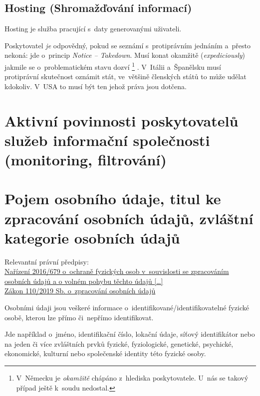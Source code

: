 \subsection{Hosting (Shromažďování informací)}

Hosting je služba pracující s~daty generovanými uživateli.

Poskytovatel \emph{je} odpovědný, pokud se seznámí s~protiprávním jednáním a~přesto nekoná: jde o~princip \emph{Notice -- Takedown}.
Musí konat okamžitě (\emph{expediciously}) jakmile se o~problematickém stavu dozví%
\footnote{
	V~Německu je \emph{okamžitě} chápáno z~hlediska poskytovatele.
	U~nás se takový případ ještě k~soudu nedostal.
}%
.
V~Itálii a~Španělsku musí protiprávní skutečnost oznámit stát, ve~většině členských států to může udělat kdokoliv.
V~USA to musí být ten jehož práva jsou dotčena.


\clearpage
\section{Aktivní povinnosti poskytovatelů služeb informační společnosti (monitoring, filtrování)}

\clearpage
\section{Pojem osobního údaje, titul ke zpracování osobních údajů, zvláštní kategorie osobních údajů}

{}Relevantní právní předpisy:
\\\href{https://eur-lex.europa.eu/legal-content/CS/ALL/?uri=CELEX:32016R0679
}{Nařízení 2016/679 o~ochraně fyzických osob v~souvislosti se zpracováním osobních údajů a o volném pohybu těchto údajů [\dots]}
\\\href{https://www.zakonyprolidi.cz/cs/2019-110}{Zákon 110/2019 Sb. o~zpracování osobních údajů}

Osobními údaji jsou veškeré informace o~identifikované/identifikovatelné fyzické osobě, kterou lze přímo či~nepřímo identifikovat.

Jde například o~jméno, identifikační číslo, lokační údaje, síťový identifikátor nebo na jeden či více zvláštních prvků fyzické, fyziologické, genetické, psychické, ekonomické, kulturní nebo společenské identity této fyzické osoby.

